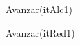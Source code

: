 \begin{Algoritmos}
\begin{algorithm}
\begin{algorithmic}[0]
							
						\EndIf
						\State Avanzar(itAlc1) 
					\EndWhile
					
				\EndIf
				
			\EndIf
			\State Avanzar(itRed1) 
		\EndWhile
	\EndIf
	
	
\EndFunction
\end{algorithmic}
\end{algorithm}


\end{Algoritmos}

\newpage


